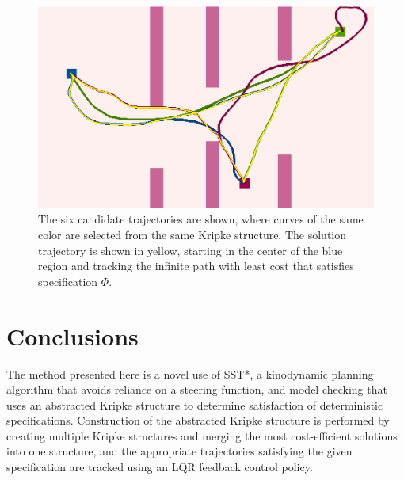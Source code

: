 \begin{figure}
    \centering
    \includegraphics[scale=0.61]{./figures/doubleint2-good-lqr.png}
    \caption[Double Integrator Example --- Simulation Results]{The six candidate trajectories are shown, where curves of the same color are selected from the same Kripke structure. The solution trajectory is shown in yellow, starting in the center of the blue region and tracking the infinite path with least cost that satisfies specification $\Phi$.} 
\label{fig:sol}
\end{figure}


   

\section{Conclusions}

The method presented here is a novel use of SST*, a kinodynamic planning algorithm that avoids reliance on a steering function, and \mucalc{} model checking that uses an abstracted Kripke structure to determine satisfaction of deterministic \mucalc{} specifications. Construction of the abstracted Kripke structure is performed by creating multiple Kripke structures and merging the most cost-efficient solutions into one structure, and the appropriate trajectories satisfying the given specification are tracked using an LQR feedback control policy.

